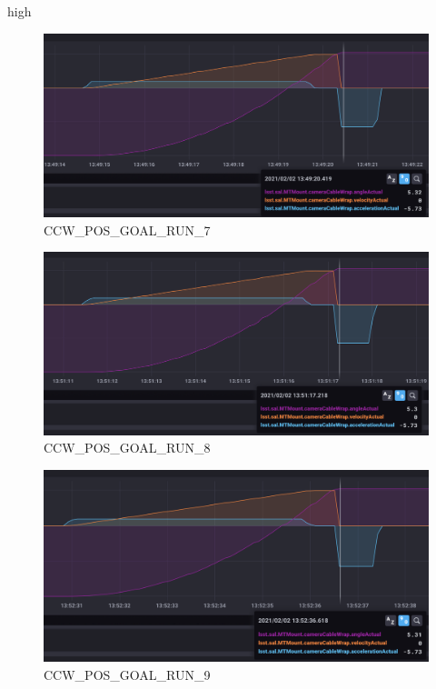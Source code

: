 high\documentclass[SE,lsstdraft,authoryear,toc]{lsstdoc}
\begin{document}
\begin{figure}[h!]
  \includegraphics[width=\linewidth]{media/CCW_high_speed_pos_test7.png}
  \caption{CCW\_POS\_GOAL\_RUN\_7}
  \label{fig:CCW_POS_GOAL_RUN_7}
\end{figure}
\begin{figure}[h!]
  \includegraphics[width=\linewidth]{media/CCW_high_speed_pos_test8.png}
  \caption{CCW\_POS\_GOAL\_RUN\_8}
  \label{fig:CCW_POS_GOAL_RUN_8}
\end{figure}
\begin{figure}[h!]
  \includegraphics[width=\linewidth]{media/CCW_high_speed_pos_test9.png}
  \caption{CCW\_POS\_GOAL\_RUN\_9}
  \label{fig:CCW_POS_GOAL_RUN_9}
\end{figure}
\end{document}
